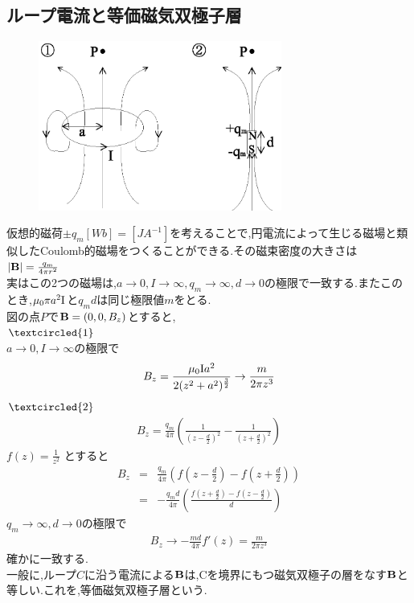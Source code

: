 \documentclass[../main]{subfiles}
\begin{document}
\subsection{ループ電流と等価磁気双極子層}
\begin{figure}[htbp]
 \begin{center}
  \includegraphics[width=80mm]{9.5.eps}
 \end{center}
 \caption{}
 \label{fig:five}
\end{figure}
仮想的磁荷$\pm q_m [Wb]=[JA^{-1}]$を考えることで,円電流によって生じる磁場と類似したCoulomb的磁場をつくることができる.その磁束密度の大きさは
$|{\bf B}|=\frac{q_m}{4 \pi r^2}$ \\
実はこの2つの磁場は,$a \to 0,I \to \infty , q_m \to \infty ,d \to 0 $の極限で一致する.またこのとき,$\mu_0 \pi a^2 {\rm I}$と$q_md$は同じ極限値$m$をとる. \\
図の点$P$で${\bf B}=(0,0,B_z)$とすると, \\
$\textcircled{\scriptsize 1}$ \\
$a \to 0,I \to \infty$の極限で
\begin{eqnarray*}
B_z = \frac{\mu_0 {\rm I} a^2}{2(z^2+a^2)^{\frac{3}{2}}} \to \frac{m}{2 \pi z^3}
\end{eqnarray*}
$\textcircled{\scriptsize 2}$ \\
\begin{eqnarray*}
B_z = \frac{q_m}{4 \pi} \left( \frac{1}{(z-\frac{d}{2})^2} - \frac{1}{(z+\frac{d}{2})^2} \right)
\end{eqnarray*}
$f(z)=\frac{1}{z^2}$ とすると
\begin{eqnarray*}
B_z &=& \frac{q_m}{4 \pi} \left( f(z-\frac{d}{2})-f(z+\frac{d}{2}) \right) \\
&=& -\frac{q_m d}{4 \pi } \left( \frac{ f(z+\frac{d}{2})-f(z-\frac{d}{2}) }{d} \right)
\end{eqnarray*}
$q_m \to \infty ,d \to 0$の極限で
\begin{eqnarray*}
B_z \to -\frac{m d}{4 \pi} f'(z) = \frac{m}{2 \pi z^3}
\end{eqnarray*}
確かに一致する. \\
一般に,ループ$C$に沿う電流による${\bf B}$は,Cを境界にもつ磁気双極子の層をなす${\bf B}$と等しい.これを,等価磁気双極子層という.
\end{document}
